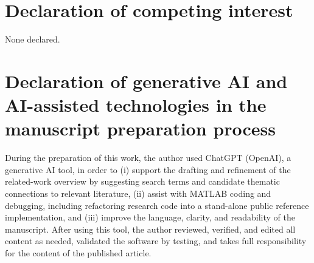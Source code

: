 \documentclass[preprint,12pt]{elsarticle}  %
\theoremstyle{definition}
\theoremstyle{definition}
\theoremstyle{definition}
\theoremstyle{definition}
\theoremstyle{definition}
\theoremstyle{remark}
\theoremstyle{remark}
\theoremstyle{remark}
\begin{document}
\section*{Declaration of competing interest}
None declared.

\section*{Declaration of generative AI and AI-assisted technologies in the manuscript preparation process}
During the preparation of this work, the author used ChatGPT \mbox{(OpenAI)}, a generative AI tool, in order to
(i) support the drafting and refinement of the related-work overview by suggesting search terms and
candidate thematic connections to relevant literature,
(ii) assist with MATLAB coding and debugging, including refactoring research code into a stand-alone
public reference implementation, and
(iii) improve the language, clarity, and readability of the manuscript.
After using this tool, the author reviewed, verified, and edited all content as needed, validated the software by testing, and takes full responsibility for the content of the published article.
\end{document}
